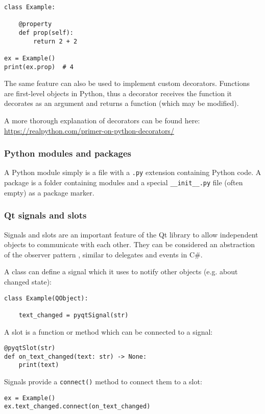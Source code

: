 \begin{verbatim}
class Example:

    @property
    def prop(self):
        return 2 + 2

ex = Example()
print(ex.prop)  # 4
\end{verbatim}

The same feature can also be used to implement custom decorators. Functions are
first-level objects in Python, thus a decorator receives the function it
decorates as an argument and returns a function (which may be modified).

A more thorough explanation of decorators can be found here: \\
\url{https://realpython.com/primer-on-python-decorators/}

\subsubsection{Python modules and packages}
A Python module simply is a file with a \verb|.py| extension containing Python
code. A package is a folder containing modules and a special \verb|__init__.py|
file (often empty) as a package marker.

\subsubsection{Qt signals and slots}
Signals and slots are an important feature of the Qt library to allow
independent objects to communicate with each other. They can be considered an
abstraction of the observer pattern \autocite[293ff]{gof}, similar to delegates
and events in C\#.

A class can define a signal which it uses to notify other objects (e.g. about
changed state):

\begin{verbatim}
class Example(QObject):

    text_changed = pyqtSignal(str)
\end{verbatim}

A slot is a function or method which can be connected to a signal:

\begin{verbatim}
@pyqtSlot(str)
def on_text_changed(text: str) -> None:
    print(text)
\end{verbatim}

Signals provide a \verb|connect()| method to connect them to a slot:

\begin{verbatim}
ex = Example()
ex.text_changed.connect(on_text_changed)
\end{verbatim}

